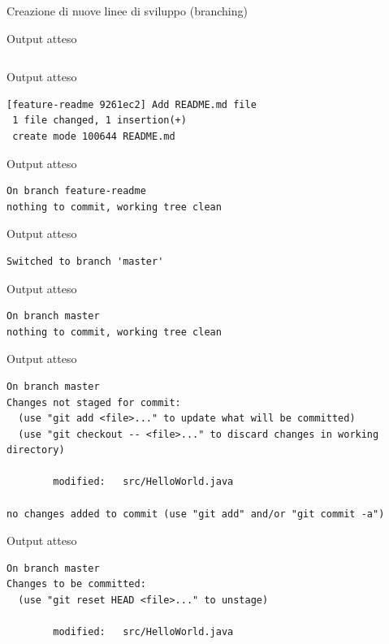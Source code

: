 \documentclass[xcolor=dvipsnames,presentation]{beamer}
\begin{document}
\begin{frame}{Creazione di nuove linee di sviluppo (branching)}
\begin{block}{Output atteso}
\begin{Verbatim}[fontsize=\scriptsize]
        \end{Verbatim}
    \end{block}
    \begin{block}{Output atteso}
        \begin{Verbatim}[fontsize=\scriptsize]
[feature-readme 9261ec2] Add README.md file
 1 file changed, 1 insertion(+)
 create mode 100644 README.md
        \end{Verbatim}
    \end{block}
    \begin{block}{Output atteso}
        \begin{Verbatim}[fontsize=\scriptsize]
On branch feature-readme
nothing to commit, working tree clean
        \end{Verbatim}
    \end{block}
    \begin{block}{Output atteso}
        \begin{Verbatim}[fontsize=\scriptsize]
Switched to branch 'master'
        \end{Verbatim}
    \end{block}
    \begin{block}{Output atteso}
        \begin{Verbatim}[fontsize=\scriptsize]
On branch master
nothing to commit, working tree clean
        \end{Verbatim}
    \end{block}
    \begin{block}{Output atteso}
        \begin{Verbatim}[fontsize=\scriptsize]
On branch master
Changes not staged for commit:
  (use "git add <file>..." to update what will be committed)
  (use "git checkout -- <file>..." to discard changes in working directory)

        modified:   src/HelloWorld.java

no changes added to commit (use "git add" and/or "git commit -a")
        \end{Verbatim}
    \end{block}
    \begin{block}{Output atteso}
        \begin{Verbatim}[fontsize=\scriptsize]
On branch master
Changes to be committed:
  (use "git reset HEAD <file>..." to unstage)

        modified:   src/HelloWorld.java


\end{Verbatim}
\end{block}
\end{frame}
\end{document}
